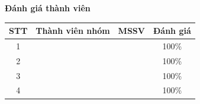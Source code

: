\textbf{\Large Đánh giá thành viên}
\bigskip
\begin{center}
    \begin{tabular}{|c|c|c|c|} \hline 
         \textbf{STT} & \textbf{Thành viên nhóm}& \textbf{MSSV}    & \textbf{Đánh giá} \\ \hline 
        1   &  &  & 100\%  \\ \hline 
        2   &  &  & 100\% \\ \hline
        3   &  &  & 100\%  \\ \hline
        4   &  &  & 100\% \\ \hline
    
    \end{tabular}
\end{center}
\newpage